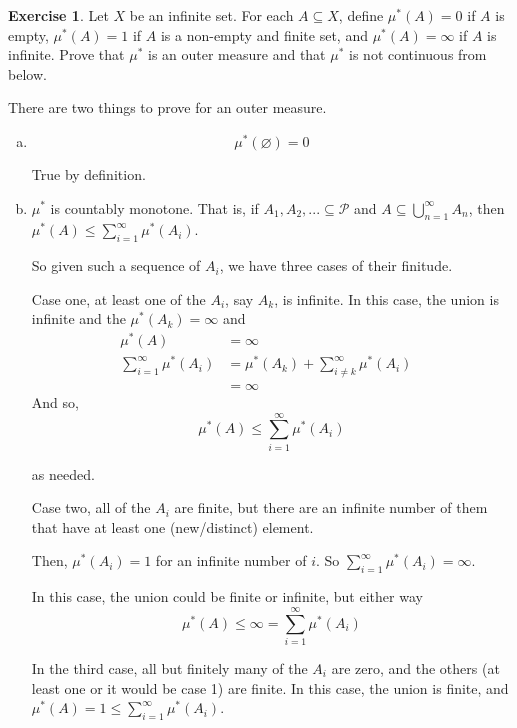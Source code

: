 \documentclass[11pt,oneside]{article}
\numberwithin{equation}{section}
\theoremstyle{definition}
\newtheorem{exercise}{Exercise}
\begin{document}
\begin{exercise}
  Let $X$ be an infinite set.  For each $A \subseteq X$,
  define $\mu^* (A) = 0$ if $A$ is empty, $\mu^*(A) = 1$ if
  $A$ is a non-empty and finite set, and $\mu^*(A) = \infty$
  if $A$ is infinite.  Prove that $\mu^*$ is an
  outer measure and that $\mu^*$ is not continuous from below.
\end{exercise}
\begin{solution}
  There are two things to prove for an outer measure.
  \begin{enumerate}[(a)]
    \item
      $$
      \mu ^ *(\varnothing) = 0
      $$

    True by definition.
    \item
      $      \mu ^ * $ is countably monotone.  That is, if $A_1, A_2, ... \subseteq \mathscr{P}$ and
      $A \subseteq \bigcup \limits _ {n=1} ^ {\infty} A_n$, then
      $\mu ^ * (A) \leq \sum \limits _ {i=1} ^ {\infty} \mu ^* ( A_i)$.

      So given such a sequence of $A_i$, we have three cases of their finitude.

      Case one, at least one of the $A_i$, say $A_k$, is infinite.  In this case,
      the union is infinite and the $\mu ^ * (A_k) = \infty$ and
      \begin{align*}
        \mu ^ * (A) &= \infty  & \\
        \sum \limits _ {i=1} ^ {\infty} \mu ^* ( A_i) &= \mu ^* (A_k) + \sum _{i\neq k} ^ \infty \mu ^*  (A_i) & \\ 
        & = \infty  & 
      \end{align*}
      And so,
      $$
      \mu ^ * (A) \leq   \sum \limits _ {i=1} ^ {\infty} \mu ^* ( A_i)  
      $$

      as needed.

      Case two, all of the $A_i$ are finite, but there are an infinite
      number of them that have at least one (new/distinct) element.

      Then, $\mu ^*(A_i) = 1$ for an infinite number of $i$.  So
      $   \sum \limits _ {i=1} ^ {\infty} \mu ^* ( A_i) = \infty $. 

      In this case, the union could be finite or infinite, but either way 
      $$
      \mu^* (A) \leq \infty =  \sum \limits _ {i=1} ^ {\infty} \mu ^* ( A_i) 
      $$

      In the third case, all but finitely many of the $A_i$ are zero,
      and the others (at least one or it would be case 1) are finite.
      In this case, the union is finite, and $\mu^* (A) = 1 \leq \sum
      \limits _ {i=1} ^ {\infty} \mu ^* ( A_i)$.


\end{enumerate}
\end{solution}
\end{document}
